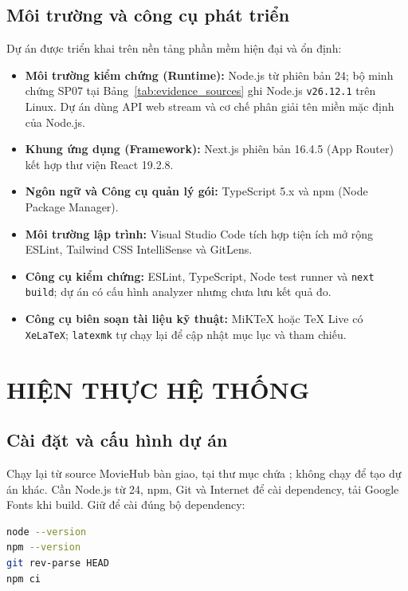 \documentclass[12pt,a4paper]{extarticle}
\begin{document}
\subsection{Môi trường và công cụ phát triển}
Dự án được triển khai trên nền tảng phần mềm hiện đại và ổn định:
\begin{itemize}[noitemsep]
    \item \textbf{Môi trường kiểm chứng (Runtime):} Node.js từ phiên bản 24; bộ minh chứng SP07 tại Bảng~\ref{tab:evidence_sources} ghi Node.js \texttt{v26.12.1} trên Linux. Dự án dùng API web stream và cơ chế phân giải tên miền mặc định của Node.js.
    \item \textbf{Khung ứng dụng (Framework):} Next.js phiên bản 16.4.5 (App Router) kết hợp thư viện React 19.2.8.
    \item \textbf{Ngôn ngữ và Công cụ quản lý gói:} TypeScript 5.x và npm (Node Package Manager).
    \item \textbf{Môi trường lập trình:} Visual Studio Code tích hợp tiện ích mở rộng ESLint, Tailwind CSS IntelliSense và GitLens.
    \item \textbf{Công cụ kiểm chứng:} ESLint, TypeScript, Node test runner và \texttt{next build}; dự án có cấu hình analyzer nhưng chưa lưu kết quả đo.
    \item \textbf{Công cụ biên soạn tài liệu kỹ thuật:} MiKTeX hoặc TeX Live có \texttt{XeLaTeX}; \texttt{latexmk} tự chạy lại để cập nhật mục lục và tham chiếu.
\end{itemize}

\newpage
\section{HIỆN THỰC HỆ THỐNG}

\subsection{Cài đặt và cấu hình dự án}
\label{sec:setup}
Chạy lại từ source MovieHub bàn giao, tại thư mục chứa ; không chạy  để tạo dự án khác. Cần Node.js từ 24, npm, Git và Internet để cài dependency, tải Google Fonts khi build. Giữ  để cài đúng bộ dependency:
\begin{lstlisting}[language=bash]
node --version
npm --version
git rev-parse HEAD
npm ci
\end{lstlisting}
\end{document}
